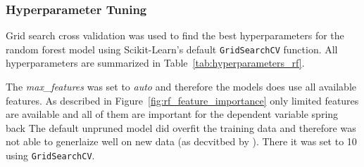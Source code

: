 
%



%
%




\subsubsection*{Hyperparameter Tuning}
Grid search cross validation was used to find the best hyperparameters for
the random forest model using Scikit-Learn's default \texttt{GridSearchCV} function.
All hyperparameters are summarized in Table~\ref{tab:hyperparameters_rf}.

The \textit{max\_features} was set to \textit{auto} and therefore the models
does use all available features.
As described in Figure~\ref{fig:rf_feature_importance} only limited features are
available and all of them are important for the dependent variable spring back
The default unpruned model did overfit the training data and therefore was not able to
generlaize well on new data (as decvitbed by \cite[p. 133-136]{
    muller_introductionmachinelearning_2016}).
There it was set to 10 using \texttt{GridSearchCV}.

